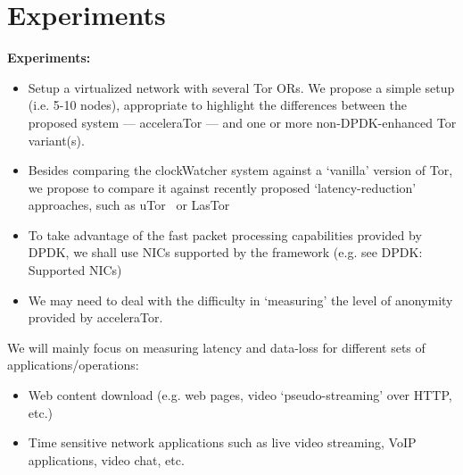 \section{Experiments}
\label{sec:experiments}

\textbf{Experiments:}

\begin{itemize}
	
	\item Setup a virtualized network with several Tor ORs. We propose a simple setup (i.e. 5-10 nodes), appropriate to highlight the differences between the proposed system --- acceleraTor --- and one or more non-DPDK-enhanced Tor variant(s).

	\item Besides comparing the clockWatcher system against a `vanilla' version of Tor, we propose to compare it against recently proposed `latency-reduction' approaches, such as uTor~\cite{179191} or LasTor~\cite{Akhoondi:2012:LLA:2310656.2310712}

	\item To take advantage of the fast packet processing capabilities provided by DPDK, we shall use NICs supported by the framework (e.g. see DPDK: Supported NICs)

	\item We may need to deal with the difficulty in `measuring' the level of anonymity provided by acceleraTor. 

\end{itemize}

We will mainly focus on measuring latency and data-loss for different sets of applications\slash operations:

\begin{itemize}

	\item Web content download (e.g. web pages, video ‘pseudo-streaming’ over HTTP, etc.)
	\item Time sensitive network applications such as live video streaming, VoIP applications, video chat, etc.

\end{itemize}

